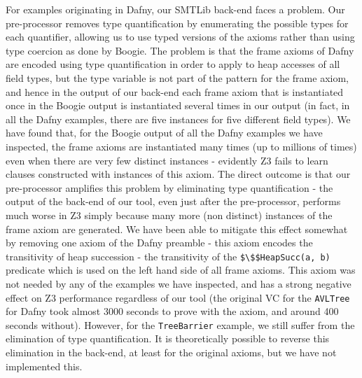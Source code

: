 For examples originating in Dafny, our SMTLib back-end faces a problem.
Our pre-processor removes type quantification by enumerating the possible types for each quantifier, 
allowing us to use typed versions of the axioms rather than using type coercion as done by Boogie.
The problem is that the frame axioms of Dafny are encoded using type quantification in order to apply to heap accesses of all field types, but the type variable is not part of the pattern for the frame axiom, 
and hence in the output of our back-end each frame axiom that is instantiated once in the Boogie output is instantiated several times in our output (in fact, in all the Dafny examples, there are five instances for five different field types). We have found that, for the Boogie output of all the Dafny examples we have inspected, the frame axioms are instantiated many times (up to millions of times) even when there are very few distinct instances - evidently Z3 fails to learn clauses constructed with instances of this axiom. 
The direct outcome is that our pre-processor amplifies this problem by eliminating type quantification - the output of the back-end of our tool, even just after the pre-processor, performs much worse in Z3 simply because many more (non distinct) instances of the frame axiom are generated.
We have been able to mitigate this effect somewhat by removing one axiom of the Dafny preamble - this axiom
encodes the transitivity of heap succession - the transitivity of the \lstinline|$\$$HeapSucc(a, b)| predicate which is used on the left hand side of all frame axioms. This axiom was not needed by any of the examples we have inspected,
and has a strong negative effect on Z3 performance regardless of our tool (the original VC for the \lstinline|AVLTree| for Dafny took almost 3000 seconds to prove with the axiom, and around 400 seconds without).
However, for the \lstinline|TreeBarrier| example, we still suffer from the elimination of type quantification.
It is theoretically possible to reverse this elimination in the back-end, at least for the original axioms, but we have not implemented this.




